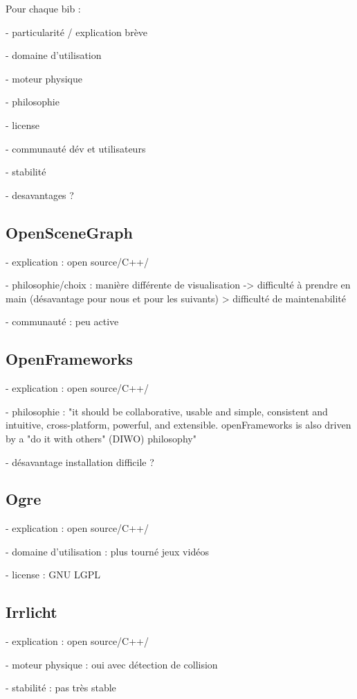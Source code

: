 Pour chaque bib : 

- particularité / explication brève

- domaine d'utilisation

- moteur physique 

- philosophie

- license

- communauté dév et utilisateurs

- stabilité

- desavantages ?

\subsection{OpenSceneGraph}
- explication : open source/C++/

- philosophie/choix :  manière différente de visualisation -> difficulté à prendre en main (désavantage pour nous et pour les suivants) > difficulté de maintenabilité

- communauté : peu active

\subsection{OpenFrameworks}
- explication : open source/C++/

- philosophie : "it should be collaborative, usable and simple, consistent and intuitive, cross-platform, powerful, and extensible. openFrameworks is also driven by a "do it with others" (DIWO) philosophy"

- désavantage installation difficile ?


\subsection{Ogre}
- explication : open source/C++/

- domaine d'utilisation :  plus tourné jeux vidéos 

- license : GNU LGPL \\

\subsection{Irrlicht}
- explication : open source/C++/

- moteur physique : oui avec détection de collision

- stabilité : pas très stable 

